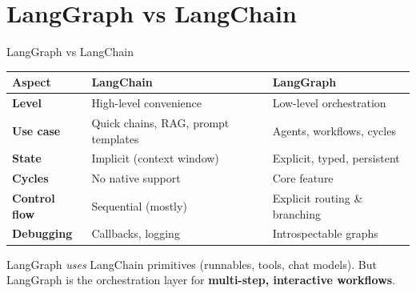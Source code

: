 \documentclass[aspectratio=169,11pt]{beamer}
\begin{document}
\section{LangGraph vs LangChain}
\begin{frame}[t]{LangGraph vs LangChain}
\setlength{\itemsep}{1pt}
\vspace{0.1cm}

\begin{tabular}{p{4cm}p{5.5cm}p{5.5cm}}
\toprule
\textbf{Aspect} & \textbf{LangChain} & \textbf{LangGraph} \\
\midrule
\textbf{Level} & High-level convenience & Low-level orchestration \\
\textbf{Use case} & Quick chains, RAG, prompt templates & Agents, workflows, cycles \\
\textbf{State} & Implicit (context window) & Explicit, typed, persistent \\
\textbf{Cycles} & No native support & Core feature \\
\textbf{Control flow} & Sequential (mostly) & Explicit routing \& branching \\
\textbf{Debugging} & Callbacks, logging & Introspectable graphs \\
\bottomrule
\end{tabular}

\vspace{0.15cm}

\begin{conceptbox}
LangGraph \textit{uses} LangChain primitives (runnables, tools, chat models). But LangGraph is the orchestration layer for \textbf{multi-step, interactive workflows}.
\end{conceptbox}
\end{frame}
\end{document}
